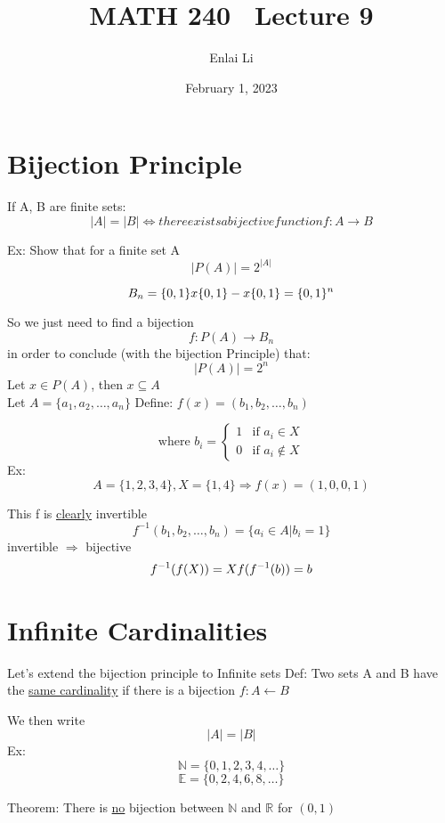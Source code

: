 \documentclass{article}
\author{Enlai Li}
\title{MATH 240 \textemdash \ Lecture 9}
\date{February 1, 2023}
\begin{document}
\maketitle

\section{Bijection Principle}
If A, B are finite sets: \\

\[|A| = |B| \iff there exists a bijective function f: A \rightarrow B\]

Ex: Show that for a finite set A
\[|P(A)| = 2^{|A|}\]

\[B_n = \{0, 1\} x \{0,1\} - x\{0, 1\} \\
    = \{0,1\}^n\]

So we just need to find a bijection
\[
    f: P(A) \rightarrow B_n\]
in order to conclude (with the bijection Principle) that:
\[|P(A)| = 2^n\]
Let $x \in P(A)$, then $x \subseteq A$ \\
Let $A = \{a_1, a_2, \ldots, a_n\}$
Define: $f(x) = (b_1, b_2, \ldots, b_n)$

\begin{equation}
    \text{where $b_i$} =
    \begin{cases}
        1 & \text{if $a_i \in X$}    \\
        0 & \text{if $a_i \notin X$}
    \end{cases}
\end{equation}
Ex: \[A=\{1,2,3,4\}, X=\{1,4\} \Rightarrow f(x) = (1,0,0,1)\]

This f is \underline{clearly} invertible
\[f^{-1}(b_1, b_2, \ldots, b_n) = \{a_i \in A | b_i = 1\}\]
invertible $\Rightarrow$ bijective
\[f^{-1}(f(X)) = X \\
    f(f^{-1}(b)) = b\]

\section{Infinite Cardinalities}
Let's extend the bijection principle to Infinite sets
Def: Two sets A and B have the \underline{same cardinality} if there is a bijection $f:A\leftarrow B$

We then write \[|A| = |B|\]
Ex:
\[ \mathbb{N} = \{0,1,2,3,4,\ldots \}\]
\[ \mathbb{E} = \{0,2,4,6,8,\ldots \}\]


Theorem: There is \underline{no} bijection between $\mathbb{N}$ and $\mathbb{R}$ for $(0, 1)$
\end{document}
